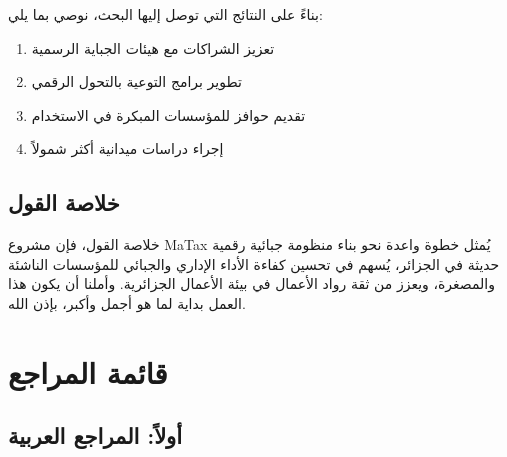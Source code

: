 \documentclass[12pt, a4paper, twoside]{report}
\begin{document}
بناءً على النتائج التي توصل إليها البحث، نوصي بما يلي:
\begin{enumerate}
    \item تعزيز الشراكات مع هيئات الجباية الرسمية
    \item تطوير برامج التوعية بالتحول الرقمي
    \item تقديم حوافز للمؤسسات المبكرة في الاستخدام
    \item إجراء دراسات ميدانية أكثر شمولاً
\end{enumerate}

\section{خلاصة القول}

خلاصة القول، فإن مشروع MaTax يُمثل خطوة واعدة نحو بناء منظومة جبائية رقمية حديثة في الجزائر، يُسهم في تحسين كفاءة الأداء الإداري والجبائي للمؤسسات الناشئة والمصغرة، ويعزز من ثقة رواد الأعمال في بيئة الأعمال الجزائرية. وأملنا أن يكون هذا العمل بداية لما هو أجمل وأكبر، بإذن الله.

\newpage

\chapter*{قائمة المراجع}

\section*{أولاً: المراجع العربية}
\end{document}
